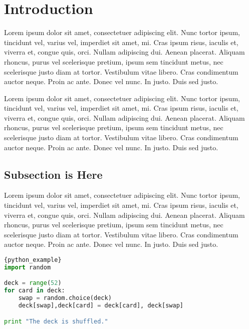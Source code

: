 \section{Introduction}

Lorem ipsum dolor sit amet, consectetuer adipiscing elit. Nunc tortor ipsum, tincidunt vel, varius vel, imperdiet sit amet, mi. Cras ipsum risus, iaculis et, viverra et, congue quis, orci. Nullam adipiscing dui. Aenean placerat. Aliquam rhoncus, purus vel scelerisque pretium, ipsum sem tincidunt metus, nec scelerisque justo diam at tortor. Vestibulum vitae libero. Cras condimentum auctor neque. Proin ac ante. Donec vel nunc. In justo. Duis sed justo.

Lorem ipsum dolor sit amet, consectetuer adipiscing elit. Nunc tortor ipsum, tincidunt vel, varius vel, imperdiet sit amet, mi. Cras ipsum risus, iaculis et, viverra et, congue quis, orci. Nullam adipiscing dui. Aenean placerat. Aliquam rhoncus, purus vel scelerisque pretium, ipsum sem tincidunt metus, nec scelerisque justo diam at tortor. Vestibulum vitae libero. Cras condimentum auctor neque. Proin ac ante. Donec vel nunc. In justo. Duis sed justo.
\subsection{Subsection is Here}
Lorem ipsum dolor sit amet, consectetuer adipiscing elit. Nunc tortor ipsum, tincidunt vel, varius vel, imperdiet sit amet, mi. Cras ipsum risus, iaculis et, viverra et, congue quis, orci. Nullam adipiscing dui. Aenean placerat. Aliquam rhoncus, purus vel scelerisque pretium, ipsum sem tincidunt metus, nec scelerisque justo diam at tortor. Vestibulum vitae libero. Cras condimentum auctor neque. Proin ac ante. Donec vel nunc. In justo. Duis sed justo.





\begin{lstlisting}[language=Python, caption=Python Example]{python_example}
import random

deck = range(52)
for card in deck:
    swap = random.choice(deck)
    deck[swap],deck[card] = deck[card], deck[swap]

print "The deck is shuffled."
\end{lstlisting}
